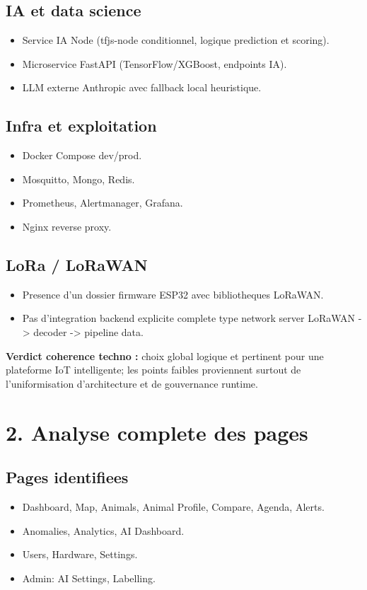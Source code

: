 \documentclass[12pt,a4paper]{article}
\begin{document}
\subsection{IA et data science}
\begin{itemize}
  \item Service IA Node (tfjs-node conditionnel, logique prediction et scoring).
  \item Microservice FastAPI (TensorFlow/XGBoost, endpoints IA).
  \item LLM externe Anthropic avec fallback local heuristique.
\end{itemize}

\subsection{Infra et exploitation}
\begin{itemize}
  \item Docker Compose dev/prod.
  \item Mosquitto, Mongo, Redis.
  \item Prometheus, Alertmanager, Grafana.
  \item Nginx reverse proxy.
\end{itemize}

\subsection{LoRa / LoRaWAN}
\begin{itemize}
  \item Presence d'un dossier firmware ESP32 avec bibliotheques LoRaWAN.
  \item Pas d'integration backend explicite complete type network server LoRaWAN -> decoder -> pipeline data.
\end{itemize}

\textbf{Verdict coherence techno :} choix global logique et pertinent pour une plateforme IoT intelligente; les points faibles proviennent surtout de l'uniformisation d'architecture et de gouvernance runtime.

\section{2. Analyse complete des pages}
\subsection{Pages identifiees}
\begin{itemize}
  \item Dashboard, Map, Animals, Animal Profile, Compare, Agenda, Alerts.
  \item Anomalies, Analytics, AI Dashboard.
  \item Users, Hardware, Settings.
  \item Admin: AI Settings, Labelling.
\end{itemize}
\end{document}
